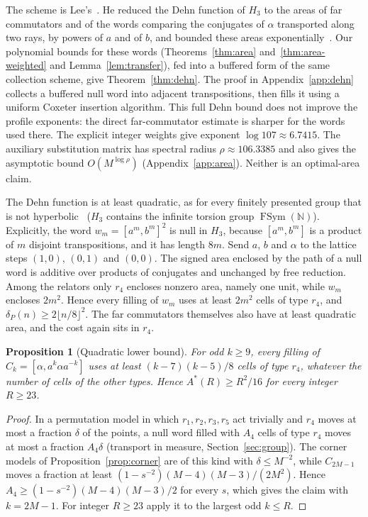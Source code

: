 \documentclass[11pt,a4paper]{article}
\theoremstyle{plain}
\newtheorem{proposition}[theorem]{Proposition}
\theoremstyle{definition}
\theoremstyle{remark}
\DeclareMathOperator{\FSym}{FSym}
\begin{document}
The scheme is Lee's~\cite[Section~4.2]{Lee2012}. He reduced the Dehn function of $H_3$ to the areas of far commutators and of the words
comparing the conjugates of $\alpha$ transported along two rays, by powers of $a$ and of $b$, and bounded these areas
exponentially~\cite[Lemma~4.7 and Remark~4.8]{Lee2012}. Our polynomial bounds for these words (Theorems~\ref{thm:area}
and~\ref{thm:area-weighted} and Lemma~\ref{lem:transfer}), fed into a buffered form of the same collection scheme, give
Theorem~\ref{thm:dehn}. The proof in Appendix~\ref{app:dehn} collects a buffered null word into adjacent transpositions, then fills it
using a uniform Coxeter insertion algorithm.
This full Dehn bound does not improve the profile exponents: the direct far-commutator estimate is sharper for the words used there.
The explicit integer weights give exponent $\log107\approx6.7415$. The auxiliary substitution matrix has spectral radius
$\rho\approx106.3385$ and also gives the asymptotic bound $O(M^{\log\rho})$ (Appendix~\ref{app:area}). Neither is an optimal-area claim.

The Dehn function is at least quadratic, as for every finitely presented group that is not hyperbolic~\cite{Olshanskii1991} ($H_3$ contains the infinite
torsion group $\FSym(\mathbb N)$). Explicitly, the word $w_m=[a^m,b^m]^2$ is null in $H_3$, because $[a^m,b^m]$ is a product of $m$ disjoint
transpositions, and it has length $8m$. Send $a$, $b$ and $\alpha$ to the lattice steps $(1,0)$, $(0,1)$ and $(0,0)$. The signed area enclosed
by the path of a null word is additive over products of conjugates and unchanged by free reduction. Among the relators only $r_4$ encloses
nonzero area, namely one unit, while $w_m$ encloses $2m^2$. Hence every filling of $w_m$ uses at least $2m^2$ cells of type $r_4$, and
$\delta_P(n)\ge2\lfloor n/8\rfloor^2$. The far commutators themselves also have at least quadratic area, and the cost again sits in $r_4$.

\begin{proposition}[Quadratic lower bound]\label{prop:area-lower}
For odd $k\ge9$, every filling of $C_k=[\alpha,a^k\alpha a^{-k}]$ uses at least $(k-7)(k-5)/8$ cells of type $r_4$, whatever the number of
cells of the other types. Hence $A^*(R)\ge R^2/16$ for every integer $R\ge23$.
\end{proposition}

\begin{proof}
In a permutation model in which $r_1,r_2,r_3,r_5$ act trivially and $r_4$ moves at most a fraction $\delta$ of the points, a null word
filled with $A_4$ cells of type $r_4$ moves at most a fraction $A_4\delta$ (transport in measure, Section~\ref{sec:group}). The corner models of
Proposition~\ref{prop:corner} are of this kind with $\delta\le M^{-2}$, while $C_{2M-1}$ moves a fraction at least $(1-s^{-2})(M-4)(M-3)/(2M^2)$.
Hence $A_4\ge(1-s^{-2})(M-4)(M-3)/2$ for every $s$, which gives the claim with $k=2M-1$. For integer $R\ge23$ apply it to the largest odd
$k\le R$.
\end{proof}
\end{document}
